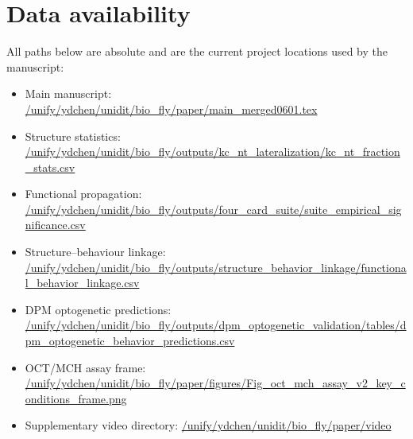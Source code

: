 \documentclass[10pt]{article}
\begin{document}
\section*{Data availability}
All paths below are absolute and are the current project locations used by the manuscript:
\begin{itemize}
  \item Main manuscript: \url{/unify/ydchen/unidit/bio_fly/paper/main_merged0601.tex}
  \item Structure statistics: \url{/unify/ydchen/unidit/bio_fly/outputs/kc_nt_lateralization/kc_nt_fraction_stats.csv}
  \item Functional propagation: \url{/unify/ydchen/unidit/bio_fly/outputs/four_card_suite/suite_empirical_significance.csv}
  \item Structure--behaviour linkage: \url{/unify/ydchen/unidit/bio_fly/outputs/structure_behavior_linkage/functional_behavior_linkage.csv}
  \item DPM optogenetic predictions: \url{/unify/ydchen/unidit/bio_fly/outputs/dpm_optogenetic_validation/tables/dpm_optogenetic_behavior_predictions.csv}
  \item OCT/MCH assay frame: \url{/unify/ydchen/unidit/bio_fly/paper/figures/Fig_oct_mch_assay_v2_key_conditions_frame.png}
  \item Supplementary video directory: \url{/unify/ydchen/unidit/bio_fly/paper/video}
\end{itemize}
\end{document}
